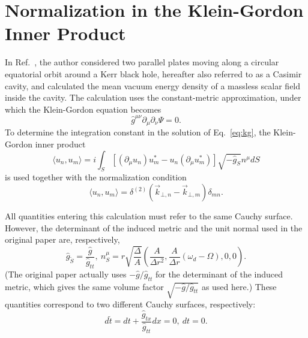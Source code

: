 \section{Normalization in the Klein-Gordon Inner Product}
\label{sec:normalization}

In Ref.~\cite{Sorge2014}, the author considered two parallel plates moving along a circular equatorial orbit around a Kerr black hole, hereafter also referred to as a Casimir cavity, and calculated the mean vacuum energy density of a massless scalar field inside the cavity. The calculation uses the constant-metric approximation, under which the Klein-Gordon equation becomes 
\begin{equation}
\label{eq:kg}
\hat{g}^{\mu\nu}\partial_{\mu}\partial_{\nu}\Psi=0.
\end{equation}
 To determine the integration constant in the solution of Eq.~\eqref{eq:kg}, the Klein-Gordon inner product 
\begin{equation}
\label{eq:inner-product}
\langle u_{n},u_{m}\rangle=i\int_{S}\left[\left(\partial_{\mu}u_{n}\right)u^{*}_{m}-u_{n}\left(\partial_{\mu}u^{*}_{m}\right)\right]\sqrt{-\hat{g}_{S}}n^{\mu}dS
\end{equation}
 is used together with the normalization condition 
\begin{equation}
\label{eq:normalization}
\langle u_{n},u_{m}\rangle=\delta^{(2)}\left(\vec{k}_{\bot,n}-\vec{k}_{\bot,m}\right)\delta_{mn}.
\end{equation}


All quantities entering this calculation must refer to the same Cauchy surface. However, the determinant of the induced metric and the unit normal used in the original paper are, respectively, 
\begin{equation}
\label{eq:mixed-data}
\hat{g}_{\tilde{S}}=\frac{\hat{g}}{\hat{g}_{tt}},\ n^{\mu}_{S}=r\sqrt{\frac{\Delta}{A}}\left(\frac{A}{\Delta r^{2}},\frac{A}{\Delta r}\left(\omega_{d}-\Omega\right),0,0\right).
\end{equation}
 (The original paper actually uses $-\hat{g}/\hat{g}_{tt}$ for the determinant of the induced metric, which gives the same volume factor $\sqrt{-\hat{g}/\hat{g}_{tt}}$ as used here.) These quantities correspond to two different Cauchy surfaces, respectively: 
\begin{equation}
\label{eq:surfaces}
d\tilde{t}=dt+\frac{\hat{g}_{tx}}{\hat{g}_{tt}}dx=0,\ dt=0.
\end{equation}

